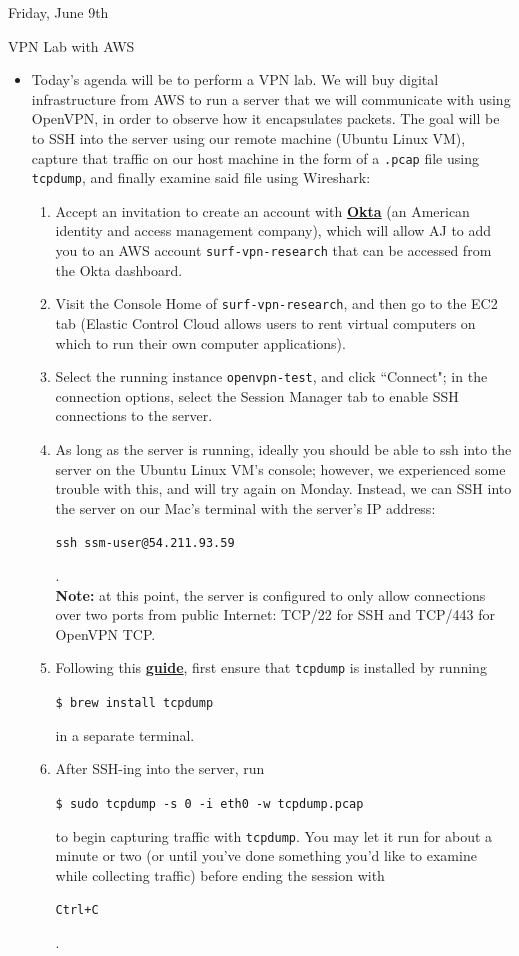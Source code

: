 \documentclass[11pt]{article}
\newcommand\codebox[1]{
    \noindent\hspace{-0.25em}\begin{tcolorbox}[on line, hbox, colback = codeblack, colframe = codeborder, coltext = white, boxrule = 1.5pt, left = 2pt, right = 2pt, top = 0.5pt, bottom = 0.5pt]
    \small\texttt{#1}\normalsize
    \end{tcolorbox}\hspace{-0.25em}
}
\begin{document}
\normalsize\begin{orangebox}{Friday, June 9th\vspace{-2.2em}\begin{flushright}VPN Lab with AWS \end{flushright}}
\begin{itemize}
    \item Today's agenda will be to perform a VPN lab. We will buy digital infrastructure from AWS to run a server that we will communicate with using OpenVPN, in order to observe how it encapsulates packets. The goal will be to SSH into the server using our remote machine (Ubuntu Linux VM), capture that traffic on our host machine in the form of a \texttt{.pcap} file using \texttt{tcpdump}, and finally examine said file using Wireshark:
    \begin{enumerate}
        \item Accept an invitation to create an account with \href{https://en.wikipedia.org/wiki/Okta,_Inc.}{\textbf{Okta}} (an American identity and access management company), which will allow AJ to add you to an AWS account \texttt{surf-vpn-research} that can be accessed from the Okta dashboard.
        \item Visit the Console Home of \texttt{surf-vpn-research}, and then go to the EC2 tab (Elastic Control Cloud allows users to rent virtual computers on which to run their own computer applications).
        \item Select the running instance \texttt{openvpn-test}, and click ``Connect"; in the connection options, select the Session Manager tab to enable SSH connections to the server.
        \item As long as the server is running, ideally you should be able to ssh into the server on the Ubuntu Linux VM's console; however, we experienced some trouble with this, and will try again on Monday. Instead, we can SSH into the server on our Mac's terminal with the server's IP address: \codebox{ssh ssm-user@54.211.93.59}. \\
        \textbf{Note:} at this point, the server is configured to only allow connections over two ports from public Internet: TCP/22 for SSH and TCP/443 for OpenVPN TCP.
        \item Following this \href{https://www.comparitech.com/net-admin/tcpdump-capture-wireshark/}{\textbf{guide}}, first ensure that \texttt{tcpdump} is installed by running \codebox{\$ brew install tcpdump} in a separate terminal.
        \item After SSH-ing into the server, run \codebox{\$ sudo tcpdump -s 0 -i eth0 -w tcpdump.pcap} to begin capturing traffic with \texttt{tcpdump}. You may let it run for about a minute or two (or until you've done something you'd like to examine while collecting traffic) before ending the session with \codebox{Ctrl+C}.

\end{enumerate}
\end{itemize}
\end{orangebox}
\end{document}
